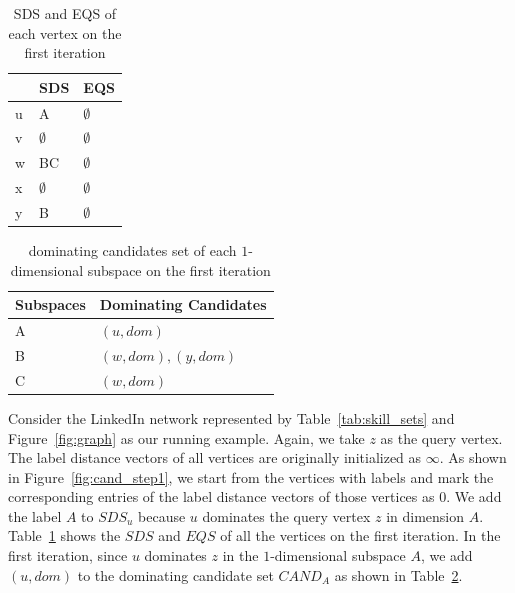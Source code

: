 \begin{table}[H]
    \centering
    \begin{tabular}{|l|l|l|}
    \hline
      & SDS         & EQS         \\ \hline
    u & A           & $\emptyset$ \\ \hline
    v & $\emptyset$ & $\emptyset$ \\ \hline
    w & BC          & $\emptyset$ \\ \hline
    x & $\emptyset$ & $\emptyset$ \\ \hline
    y & B           & $\emptyset$ \\ \hline
    \end{tabular}
    \caption{\label{font-table}SDS and EQS of each vertex on the first iteration}
    \label{tab:sds_step1}
\end{table}

\begin{table}[H]
    \centering

    \begin{tabular}{|l|l|}
    \hline
    Subspaces & Dominating Candidates \\ \hline
    A         & $(u, dom)$            \\ \hline
    B         & $(w, dom), (y, dom)$            \\ \hline
    C         & $(w, dom)$            \\ \hline
    \end{tabular}
    \caption{\label{font-table}dominating candidates set of each $1$-dimensional subspace on the first iteration}
    \label{tab:cand_set_step1}
\end{table}

Consider the LinkedIn network represented by Table~\ref{tab:skill_sets} and Figure~\ref{fig:graph} as our running example. Again, we take $z$ as the query vertex. The label distance vectors of all vertices are originally initialized as $\infty$. As shown in Figure~\ref{fig:cand_step1}, we start from the vertices with labels and mark the corresponding entries of the label distance vectors of those vertices as $0$. 
We add the label $A$ to $\mathit{SDS}_u$ because $u$ dominates the query vertex $z$ in dimension $A$. Table~\ref{tab:sds_step1} shows the $\mathit{SDS}$ and $\mathit{EQS}$ of all the vertices on the first iteration.
In the first iteration, since $u$ dominates $z$ in the $1$-dimensional subspace $A$, we add $(u, dom)$ to the dominating candidate set $\mathit{CAND}_A$ as shown in Table~\ref{tab:cand_set_step1}.

